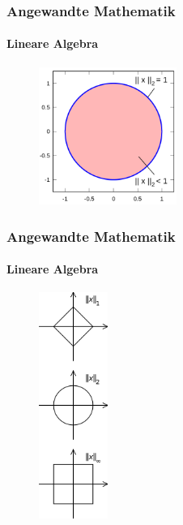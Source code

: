 \documentclass{beamer}
\begin{document}
\begin{frame}
    \frametitle{Angewandte Mathematik}
\framesubtitle{Lineare Algebra}

\begin{figure}[H]
      \centering
    \includegraphics[width=0.4\textwidth]{images/Unit_disc_2}
\end{figure}
 \end{frame}



\begin{frame}
    \frametitle{Angewandte Mathematik}
\framesubtitle{Lineare Algebra}

\begin{figure}[H]
      \centering
    \includegraphics[width=0.2\textwidth]{images/Vector_norms}
\end{figure}

 \end{frame}
\end{document}
